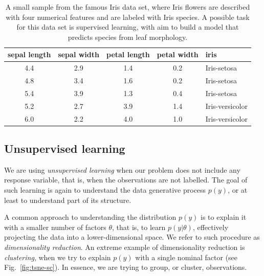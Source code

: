 \begin{refsection}
\begin{table}
\label{tab:iris-sample}
\caption{A small sample from the famous Iris data set, where Iris flowers are described with four numerical features and are labeled with Iris species. A possible task for this data set is supervised learning, with aim to build a model that predicts species from leaf morphology.}
\begin{center}
\begin{tabular}{ccccl}
\toprule
sepal length & sepal width & petal length & petal width & iris \\
\midrule
4.4 & 2.9 & 1.4 & 0.2 & Iris-setosa \\
4.8 & 3.4 & 1.6 & 0.2 & Iris-setosa \\
5.4 & 3.9 & 1.3 & 0.4 & Iris-setosa \\
5.2 & 2.7 & 3.9 & 1.4 & Iris-versicolor \\
6.0 & 2.2 & 4.0 & 1.0 & Iris-versicolor \\
\bottomrule
\end{tabular}
\end{center}
\end{table}

\subsection*{Unsupervised learning}

We are using {\em unsupervised learning} when our problem does not include any response variable, that is, when the observations are not labelled. The goal of such learning is again to understand the data generative process $p(y)$, or at least to understand part of its structure.

A common approach to understanding the distribution $p(y)$ is to explain it with a smaller number of factors $\theta$, that is, to learn $p(y|\theta)$, effectively projecting the data into a lower-dimensional space. We refer to such procedure as {\em dimensionality reduction}. An extreme example of dimensionality reduction is {\em clustering}, when we try to explain $p(y)$ with a single nominal factor (see Fig.~\ref{fig:tsne-sc}). In essence, we are trying to group, or cluster, observations.


\end{refsection}
